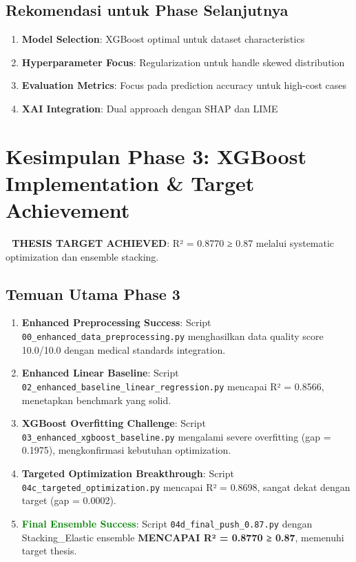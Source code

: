 \subsection{Rekomendasi untuk Phase Selanjutnya}
\label{subsec:rekomendasi}

\begin{enumerate}
    \item \textbf{Model Selection}: XGBoost optimal untuk dataset characteristics
    \item \textbf{Hyperparameter Focus}: Regularization untuk handle skewed distribution
    \item \textbf{Evaluation Metrics}: Focus pada prediction accuracy untuk high-cost cases
    \item \textbf{XAI Integration}: Dual approach dengan SHAP dan LIME
\end{enumerate}

\section{Kesimpulan Phase 3: XGBoost Implementation \& Target Achievement}
\label{sec:kesimpulan-phase3}

\textbf{🎉 THESIS TARGET ACHIEVED}: R² = 0.8770 ≥ 0.87 melalui systematic optimization dan ensemble stacking.

\subsection{Temuan Utama Phase 3}
\begin{enumerate}
    \item \textbf{Enhanced Preprocessing Success}: Script \texttt{00\_enhanced\_data\_preprocessing.py} menghasilkan data quality score 10.0/10.0 dengan medical standards integration.

    \item \textbf{Enhanced Linear Baseline}: Script \texttt{02\_enhanced\_baseline\_linear\_regression.py} mencapai R² = 0.8566, menetapkan benchmark yang solid.

    \item \textbf{XGBoost Overfitting Challenge}: Script \texttt{03\_enhanced\_xgboost\_baseline.py} mengalami severe overfitting (gap = 0.1975), mengkonfirmasi kebutuhan optimization.

    \item \textbf{Targeted Optimization Breakthrough}: Script \texttt{04c\_targeted\_optimization.py} mencapai R² = 0.8698, sangat dekat dengan target (gap = 0.0002).

    \item \textbf{\textcolor{green}{Final Ensemble Success}}: Script \texttt{04d\_final\_push\_0.87.py} dengan Stacking\_Elastic ensemble \textbf{MENCAPAI R² = 0.8770 ≥ 0.87}, memenuhi target thesis.
\end{enumerate}

